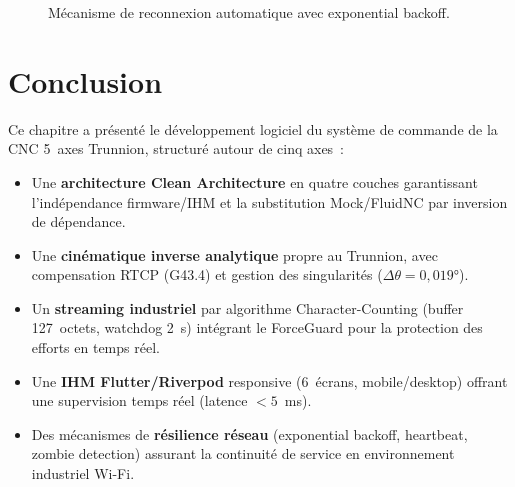 \documentclass[12pt,a4paper]{report}
\begin{document}
\begin{figure}[H]
\centering
{}
\caption{Mécanisme de reconnexion automatique avec exponential backoff.}
\label{fig:backoff}
\end{figure}

\section{Conclusion}

Ce chapitre a présenté le développement logiciel du système de commande de la CNC 5~axes Trunnion, structuré autour de cinq axes~:

\begin{itemize}
  \item Une \textbf{architecture Clean Architecture} en quatre couches garantissant l'indépendance firmware/IHM et la substitution Mock/FluidNC par inversion de dépendance.
  \item Une \textbf{cinématique inverse analytique} propre au Trunnion, avec compensation RTCP (G43.4) et gestion des singularités ($\Delta\theta = 0{,}019°$).
  \item Un \textbf{streaming industriel} par algorithme Character-Counting (buffer 127~octets, watchdog 2~s) intégrant le ForceGuard pour la protection des efforts en temps réel.
  \item Une \textbf{IHM Flutter/Riverpod} responsive (6~écrans, mobile/desktop) offrant une supervision temps réel (latence $< 5$~ms).
  \item Des mécanismes de \textbf{résilience réseau} (exponential backoff, heartbeat, zombie detection) assurant la continuité de service en environnement industriel Wi-Fi.
\end{itemize}
\end{document}
